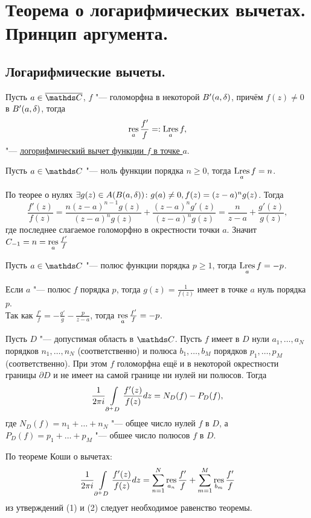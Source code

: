 \newpage
\section{Теорема о логарифмических вычетах. Принцип аргумента.}

\subsection{Логарифмические вычеты.}
\begin{Def}
Пусть $a \in \ol{\C}$, $f$ "--- голоморфна в некоторой $B'(a,\delta)$, причём $f(z) \not= 0$ в  $B'(a,\delta)$, тогда
\[
\mathop{\rm res}\limits\limits_{a} \frac{f'}{f} =: \mathop{\rm Lres}\limits\limits_{a} f,
\]
"--- \underline{логорифмический вычет функции $f$ в точке $a$}.
\end{Def}

\begin{Ut}
Пусть $a \in \C$ "--- ноль функции порядка $n \ge 0$, тогда $\mathop{\rm Lres}\limits\limits_{a} f = n$.
\end{Ut}
\begin{Proof}
По теорее о нулях $\exists g(z) \in A(B(a,\delta)) \colon g(a) \not = 0, f(z) = (z-a)^n g(z)$.
Тогда 
\[ 
\frac{f'(z)}{f(z)} = \frac{n(z-a)^{n-1} g(z)}{(z-a)^n g(z)} + \frac{(z-a)^n g'(z)}{(z-a)^n g(z)} = \frac{n}{z-a} + \frac{g'(z)}{g(z)}, 
\]
где последнее слагаемое голоморфно в окрестности точки $a$. Значит $C_{-1} = n = \mathop{\rm res}\limits\limits_{a} \frac{f'}{f}$
\end{Proof}


\begin{Ut}
Пусть $a \in \C$ "--- полюс функции порядка $p \ge 1$, тогда $\mathop{\rm Lres}\limits\limits_{a} f = -p$.
\end{Ut}
\begin{Proof}
Если $a$ "--- полюс $f$ порядка $p$, тогда $g(z) = \frac{1}{f(z)}$ имеет в точке $a$ нуль порядка $p$. \\Так как $\frac{f'}{f} = - \frac{g'}{g} - \frac{p}{z-a}$, тогда $\mathop{\rm res}\limits\limits_{a} \frac{f'}{f} = -p$.
\end{Proof}

\begin{The}
Пусть $D$ "--- допустимая область в $\C$. Пусть $f$ имеет в $D$ нули $a_1,\dots,a_N$ порядков $n_1,\dots,n_N$ (соответственно) и полюса $b_1,\dots,b_M$ порядков $p_1,\dots,p_M$ (соответственно).
При этом $f$ голоморфна ещё и в некоторой окрестности границы $\partial D$ и не имеет на самой границе ни нулей ни полюсов. 
Тогда 
\[
\frac{1}{2\pi i} 
\int\limits_{\partial^{+}D} 
\frac{f'(z)}{f(z)} dz = 
N_D(f) - P_D(f),
\]
где $N_D(f) = n_1 + \dots + n_N$ "--- общее число нулей $f$ в $D$, 
а $P_D(f) = p_1 + \dots + p_M$ "--- обшее число полюсов $f$ в $D$.
\end{The}
\begin{Proof}
По теореме Коши о вычетах$\colon$
\[
\frac{1}{2\pi i} \int\limits_{\partial^{+}D} \frac{f'(z)}{f(z)} dz = 
\sum\limits_{n=1}^{N} \mathop{\rm res}\limits\limits_{a_n} \frac{f'}{f} + 
\sum\limits_{m=1}^{M} \mathop{\rm res}\limits\limits_{b_m} \frac{f'}{f}
\]
из утверждений (1) и (2) следует необходимое равенство теоремы.
\end{Proof}

